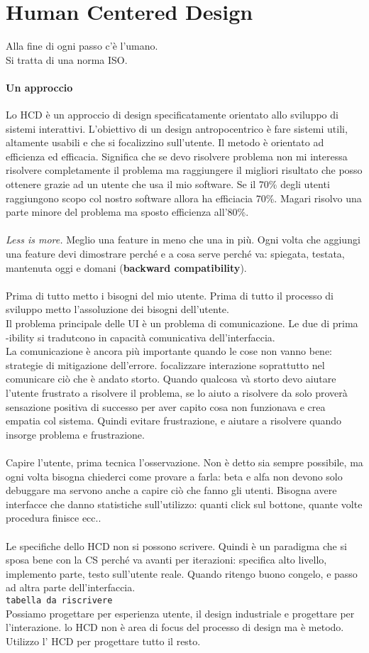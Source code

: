 \documentclass[10pt]{article}
\begin{document}
\section{Human Centered Design}
Alla fine di ogni passo c'è l'umano.\\Si tratta di una norma ISO.
\paragraph{Un approccio} Lo HCD è un approccio di design specificatamente orientato allo sviluppo di sistemi interattivi. L'obiettivo di un design antropocentrico è fare sistemi utili, altamente usabili e che si focalizzino sull'utente. Il metodo è orientato ad efficienza ed efficacia. Significa che se devo risolvere problema non mi interessa risolvere completamente il problema ma raggiungere il migliori risultato che posso ottenere grazie ad un utente che usa il mio software. Se il 70\% degli utenti raggiungono scopo col nostro software allora ha efficiacia 70\%. Magari risolvo una parte minore del problema ma sposto efficienza all'80\%.\\\\
\textit{Less is more.} Meglio una feature in meno che una in più. Ogni volta che aggiungi una feature devi dimostrare perché e a cosa serve perché va: spiegata, testata, mantenuta oggi e domani (\textbf{backward compatibility}).\\\\
Prima di tutto metto i bisogni del mio utente. Prima di tutto il processo di sviluppo metto l'assoluzione dei bisogni dell'utente.\\
Il problema principale delle UI è un problema di comunicazione. Le due di prima -ibility si tradutcono in capacità comunicativa dell'interfaccia.\\
La comunicazione è ancora più importante quando le cose non vanno bene: strategie di mitigazione dell'errore. focalizzare interazione soprattutto nel comunicare ciò che è andato storto. Quando qualcosa và storto devo aiutare l'utente frustrato a risolvere il problema, se lo aiuto a risolvere da solo proverà sensazione positiva di successo per aver capito cosa non funzionava e crea empatia col sistema. Quindi evitare frustrazione, e aiutare a risolvere quando insorge problema e frustrazione.\\\\
Capire l'utente, prima tecnica l'osservazione. Non è detto sia sempre possibile, ma ogni volta bisogna chiederci come provare a farla: beta e alfa non devono solo debuggare ma servono anche a capire ciò che fanno gli utenti. Bisogna avere interfacce che danno statistiche sull'utilizzo: quanti click sul bottone, quante volte procedura finisce ecc..\\\\
Le specifiche dello HCD non si possono scrivere. Quindi è un paradigma che si sposa bene con la CS perché va avanti per iterazioni: specifica alto livello, implemento parte, testo sull'utente reale. Quando ritengo buono congelo, e passo ad altra parte dell'interfaccia.\\

\texttt{tabella da riscrivere}\\
Possiamo progettare per esperienza utente, il design industriale e progettare per l'interazione. lo HCD non è area di focus del processo di design ma è metodo.\\Utilizzo l' HCD per progettare tutto il resto.
\end{document}
